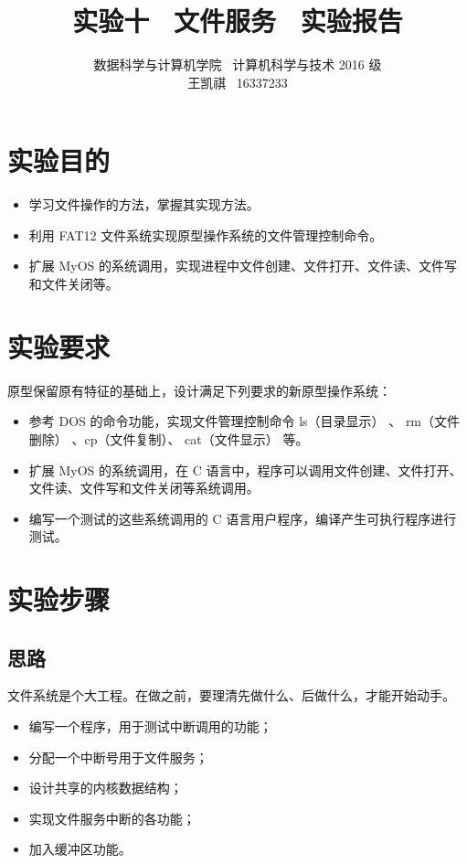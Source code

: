 \documentclass[a4paper]{article}
\begin{document}
\title{实验十 \ 文件服务 \ 实验报告}
\author {数据科学与计算机学院 \ 计算机科学与技术 2016 级 \\ 王凯祺 \ 16337233}
\maketitle

\section{实验目的}

\begin{itemize}
\item 学习文件操作的方法，掌握其实现方法。
\item 利用 FAT12 文件系统实现原型操作系统的文件管理控制命令。
\item 扩展 MyOS 的系统调用，实现进程中文件创建、文件打开、文件读、文件写和文件关闭等。
\end{itemize}

\section{实验要求}

原型保留原有特征的基础上，设计满足下列要求的新原型操作系统：

\begin{itemize}
\item 参考 DOS 的命令功能，实现文件管理控制命令 ls（目录显示） 、 rm（文件删除） 、cp（文件复制）、 cat（文件显示） 等。
\item 扩展 MyOS 的系统调用，在 C 语言中，程序可以调用文件创建、文件打开、文件读、文件写和文件关闭等系统调用。
\item 编写一个测试的这些系统调用的 C 语言用户程序，编译产生可执行程序进行测试。
\end{itemize}

\section{实验步骤}

\subsection{思路}

文件系统是个大工程。在做之前，要理清先做什么、后做什么，才能开始动手。

\begin{itemize}
\item 编写一个程序，用于测试中断调用的功能；
\item 分配一个中断号用于文件服务；
\item 设计共享的内核数据结构；
\item 实现文件服务中断的各功能；
\item 加入缓冲区功能。
\end{itemize}
\end{document}
